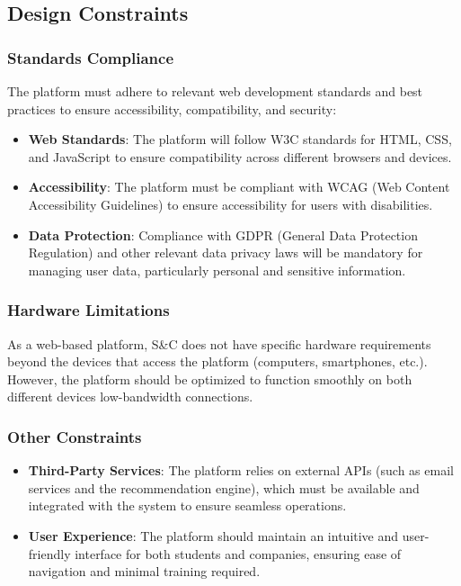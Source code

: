 \subsection{Design Constraints}

\subsubsection{Standards Compliance}
The platform must adhere to relevant web development standards and best practices to ensure accessibility, compatibility, and security:
\begin{itemize}
  \item \textbf{Web Standards}: The platform will follow W3C standards for HTML, CSS, and JavaScript to ensure compatibility across different browsers and devices.
  \item \textbf{Accessibility}: The platform must be compliant with WCAG (Web Content Accessibility Guidelines) to ensure accessibility for users with disabilities.
  \item \textbf{Data Protection}: Compliance with GDPR (General Data Protection Regulation) and other relevant data privacy laws will be mandatory for managing user data, particularly personal and sensitive information.
\end{itemize}

\subsubsection{Hardware Limitations}
As a web-based platform, S\&C does not have specific hardware requirements beyond the devices that access the platform (computers, smartphones, etc.). However, the platform should be optimized to function smoothly on both different devices low-bandwidth connections.

\subsubsection{Other Constraints}
\begin{itemize}
  \item \textbf{Third-Party Services}: The platform relies on external APIs (such as email services and the recommendation engine), which must be available and integrated with the system to ensure seamless operations.
  \item \textbf{User Experience}: The platform should maintain an intuitive and user-friendly interface for both students and companies, ensuring ease of navigation and minimal training required.
\end{itemize}

